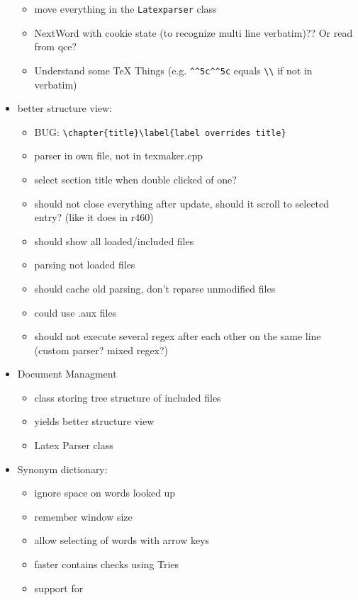 \documentclass[10pt,a4paper,landscape]{report}
\begin{document}
\begin{itemize}
\begin{itemize}
		\item move everything in the \verb+Latexparser+ class
		\item NextWord with cookie state (to recognize multi line verbatim)?? Or read from qce?
		\item Understand some TeX Things (e.g. \verb+^^5c^^5c+ equals \verb+\\+ if not in verbatim)
	\end{itemize}
	\item better structure view: \begin{itemize}
		\item BUG: \verb+\chapter{title}\label{label overrides title}+
		\item parser in own file, not in texmaker.cpp
		\item select section title when double clicked of one?
		\item should not close everything after update, should it scroll to selected entry? (like it does in r460)
		\item should show all loaded/included files
		\item parsing not loaded files
		\item should cache old parsing, don't reparse unmodified files
		\item could use .aux files
		\item should not execute several regex after each other on the same line (custom parser? mixed regex?)	
	\end{itemize}
	\item Document Managment \begin{itemize}
		\item class storing tree structure of included files
		\item yields better structure view
		\item Latex Parser class
	\end{itemize}
	\item Synonym dictionary: \begin{itemize}
		\item ignore space on words looked up
		\item remember window size
		\item allow selecting of words with arrow keys
		\item faster contains checks using Tries
		\item support for 

\end{itemize}
\end{itemize}
\end{document}
